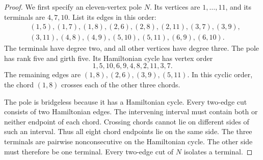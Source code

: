 \begin{proof}
We first specify an eleven-vertex pole $N$.
Its vertices are $1,\ldots,11$, and its terminals are $4,7,10$.
List its edges in this order:
\[
\begin{split}
 &(1,5),(1,7),(1,8),(2,6),(2,8),(2,11),(3,7),(3,9),\\
 &(3,11),(4,8),(4,9),(5,10),(5,11),(6,9),(6,10).
\end{split}
\]
The terminals have degree two, and all other vertices have degree three.
The pole has rank five and girth five.
Its Hamiltonian cycle has vertex order
\[
 1,5,10,6,9,4,8,2,11,3,7.
\]
The remaining edges are $(1,8),(2,6),(3,9),(5,11)$.
In this cyclic order, the chord $(1,8)$ crosses each of the other three chords.

The pole is bridgeless because it has a Hamiltonian cycle.
Every two-edge cut consists of two Hamiltonian edges.
The intervening interval must contain both or neither endpoint of each chord.
Crossing chords cannot lie on different sides of such an interval.
Thus all eight chord endpoints lie on the same side.
The three terminals are pairwise nonconsecutive on the Hamiltonian cycle.
The other side must therefore be one terminal.
Every two-edge cut of $N$ isolates a terminal.


\end{proof}
